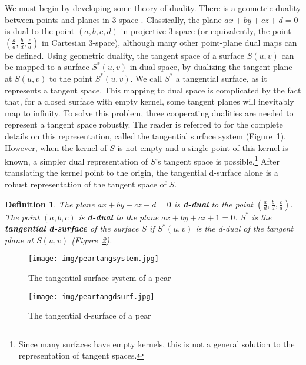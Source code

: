 \documentclass[12pt]{article}
\newtheorem{defn2}[theorem]{Definition}
\begin{document}
We must begin by developing some theory of duality.
There is a geometric duality between points and planes in 3-space \cite{hartshorne}.
Classically, the plane $ax+by+cz+d=0$ is dual to the point $(a,b,c,d)$ in projective 3-space
(or equivalently, the point $(\frac{a}{d},\frac{b}{d},\frac{c}{d})$ in Cartesian 3-space),
although many other point-plane dual maps can be defined.
Using geometric duality, the tangent space of a surface $S(u,v)$ can be mapped 
to a surface $S^*(u,v)$ in dual space, by dualizing the tangent plane at $S(u,v)$ to the point $S^*(u,v)$.
We call $S^*$ a tangential surface, as it represents a tangent space.
This mapping to dual space is complicated by the fact that, for a closed surface with empty kernel,
some tangent planes will inevitably map to infinity.
To solve this problem, 
three cooperating dualities are needed to represent a tangent space robustly.
The reader is referred to \cite{jj03tangsurf} for the complete details
on this representation, called the tangential surface system 
(Figure~\ref{fig:peartangsystem}).
However, when the kernel of $S$ is not empty and a single point of this
kernel is known,
a simpler dual representation of $S$'s tangent space is possible.\footnote{Since many
	surfaces have empty kernels, this is not a general solution to
	the representation of tangent spaces.}
After translating the kernel point to the origin,
the tangential d-surface alone is a robust representation of the tangent space of $S$.

\begin{defn2}
The plane $ax+by+cz+d=0$ is {\bf d-dual} to the point $(\frac{a}{d},\frac{b}{d},\frac{c}{d})$.
The point $(a,b,c)$ is {\bf d-dual} to the plane $ax+by+cz+1=0$.
$S^*$ is the {\bf tangential d-surface} of the surface $S$ if $S^*(u,v)$ 
is the d-dual of the tangent plane at $S(u,v)$ (Figure~\ref{fig:peartangdsurf}).
\end{defn2}

\begin{figure}[h]
\begin{center}
\texttt{[image: img/peartangsystem.jpg]}
\end{center}
\caption{The tangential surface system of a pear}
\label{fig:peartangsystem}
\end{figure}

\begin{figure}
\begin{center}
\texttt{[image: img/peartangdsurf.jpg]}
\end{center}
\caption{The tangential d-surface of a pear}
\label{fig:peartangdsurf}
\end{figure}
\end{document}
